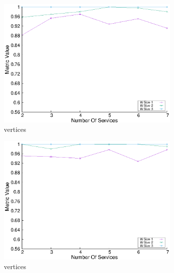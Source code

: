 \begin{figure}[H]
  \centering
  \begin{subfigure}{0.45\textwidth}
    \includegraphics[width=\textwidth]{Images/graphs/window_quality_performance_diff_perce_n7_s7_20_100_n3}
    \caption{ vertices}
    \label{fig:quality_window_perce_wide_3n}
  \end{subfigure}
  \hfill
  \begin{subfigure}{0.45\textwidth}
    \includegraphics[width=\textwidth]{Images/graphs/window_quality_performance_diff_perce_n7_s7_50_89_n3}
    \caption{ vertices}
    \label{fig:quality_window_average_perce_3n}
  \end{subfigure}
  \begin{subfigure}{0.45\textwidth}

\end{subfigure}
\end{figure}
